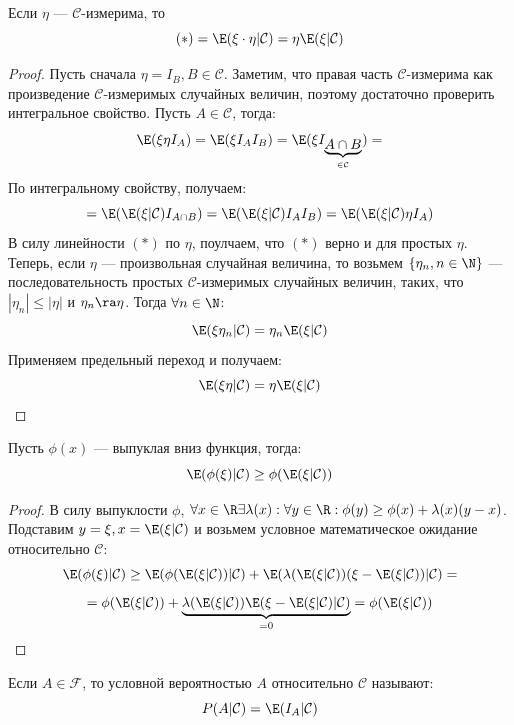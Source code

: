 \begin{proposition}
    Если \(\eta\) --- \(\mathcal{C}\)-измерима, то
    \[(*) = \E(\xi \cdot \eta | \mathcal{C}) = \eta \E (\xi | \mathcal{C})\]
\end{proposition}
\begin{proof}
    Пусть сначала \(\eta = I_B, B \in \mathcal{C}\). Заметим, что правая часть \(\mathcal{C}\)-измерима как произведение \(\mathcal{C}\)-измеримых случайных величин, поэтому достаточно проверить интегральное свойство. Пусть \(A \in \mathcal{C}\), тогда:
    \[\E(\xi\eta I_A) = \E(\xi I_AI_B) = \E(\xi I_{\underbrace{A \cap B}_{\in \mathcal{C}}}) =\]
    По интегральному свойству, получаем:
    \[= \E(\E(\xi|\mathcal{C})I_{A \cap B}) = \E(\E(\xi|\mathcal{C})I_AI_B) = \E(\E(\xi|\mathcal{C}) \eta I_A)\]
    В силу линейности \((*)\) по \(\eta\), поулчаем, что \((*)\) верно и для простых \(\eta\). Теперь, если \(\eta\) --- произвольная случайная величина, то возьмем \(\{\eta_n, n \in \N\}\) --- последовательность простых \(\mathcal{C}\)-измеримых случайных величин, таких, что \(|\eta_n| \le |\eta|\) и \(\eta_n \ra \eta\). Тогда \(\forall n \in \N\):
    \[\E(\xi\eta_n|\mathcal{C}) = \eta_n \E(\xi|\mathcal{C})\]
    Применяем предельный переход и получаем:
    \[\E(\xi\eta|\mathcal{C}) = \eta\E(\xi|\mathcal{C})\]
\end{proof}

\begin{proposition}
    Пусть \(\phi(x)\) --- выпуклая вниз функция, тогда:
    \[\E(\phi(\xi)|\mathcal{C}) \ge \phi(\E(\xi|\mathcal{C}))\]
\end{proposition}
\begin{proof}
    В силу выпуклости \(\phi\), \(\forall x \in \R \exists \lambda(x): \forall y \in \R: \phi(y) \ge \phi(x) + \lambda(x)(y - x)\). Подставим \(y = \xi, x = \E(\xi|\mathcal{C})\) и возьмем условное математическое ожидание относительно \(\mathcal{C}\):
    \[\E(\phi(\xi)|\mathcal{C}) \ge \E(\phi(\E(\xi|\mathcal{C}))|\mathcal{C}) + \E(\lambda(\E(\xi|\mathcal{C}))(\xi - \E(\xi|\mathcal{C})) | \mathcal{C}) = \]
    \[= \phi(\E(\xi|\mathcal{C})) + \underbrace{\lambda(\E(\xi|\mathcal{C}))\E(\xi - \E(\xi|\mathcal{C}) | \mathcal{C})}_{= 0} = \phi(\E(\xi|\mathcal{C}))\]
\end{proof}

\begin{definition}
    Если \(A \in \mathcal{F}\), то условной вероятностью \(A\) относительно \(\mathcal{C}\) называют:
    \[P(A|\mathcal{C}) = \E(I_A|\mathcal{C})\]
\end{definition}

